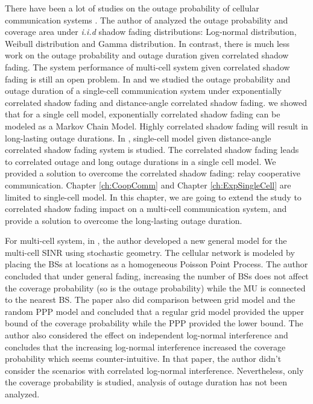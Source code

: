 \par There have been a lot of studies on the outage probability of cellular communication systems \cite{abu1991outage, petrovic2013outage, emamian2014outage}. The author of \cite{vural2015effect} analyzed the outage probability and coverage area under \emph{i.i.d} shadow fading distributions: Log-normal distribution, Weibull distribution and Gamma distribution. In contrast, there is much less work on the outage probability and outage duration given correlated shadow fading. The system performance of multi-cell system given correlated shadow fading is still an open problem. In \cite{lu2015long} and \cite{lu2015shining} we studied the outage probability and outage duration of a single-cell communication system under exponentially correlated shadow fading and distance-angle correlated shadow fading. \cite{lu2015long} we showed that for a single cell model, exponentially correlated shadow fading can be modeled as a Markov Chain Model. Highly correlated shadow fading will result in long-lasting outage durations. In \cite{lu2015shining}, single-cell model given distance-angle correlated shadow fading system is studied. The correlated shadow fading leads to correlated outage and long outage durations in a single cell model. We provided a solution to overcome the correlated shadow fading: relay cooperative communication. Chapter \ref{ch:CoopComm} and Chapter \ref{ch:ExpSingleCell} are limited to single-cell model. In this chapter, we are going to extend the study to correlated shadow fading impact on a multi-cell communication system, and provide a solution to overcome the long-lasting outage duration.
\par For multi-cell system, in \cite{andrews2011tractable}, the author developed a new general model for the multi-cell SINR using stochastic geometry. The cellular network is modeled by placing the BSs at locations as a homogeneous Poisson Point Process. The author concluded that under general fading, increasing the number of BSs does not affect the coverage probability (so is the outage probability) while the MU is connected to the nearest BS. The paper also did comparison between grid model and the random PPP model and concluded that a regular grid model provided the upper bound of the coverage probability while the PPP provided the lower bound. The author also considered the effect on independent log-normal interference and concludes that the increasing log-normal interference increased the coverage probability which seems counter-intuitive. In that paper, the author didn't consider the scenarios with correlated log-normal interference. Nevertheless, only the coverage probability is studied, analysis of outage duration has not been analyzed. 
